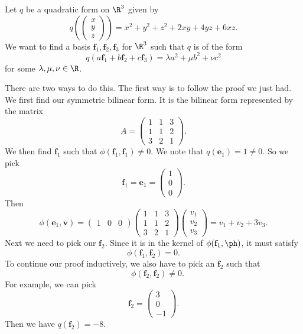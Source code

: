 \documentclass[a4paper]{article}
\begin{document}
\begin{eg}
  Let $q$ be a quadratic form on $\R^3$ given by
  \[
    q\left(
    \begin{pmatrix}
      x\\y\\z
    \end{pmatrix}\right) = x^2 + y^2 + z^2 + 2xy + 4yz + 6xz.
  \]
  We want to find a basis $\mathbf{f}_1, \mathbf{f}_2, \mathbf{f}_3$ for $\R^3$ such that $q$ is of the form
  \[
    q(a\mathbf{f}_1 + b\mathbf{f}_2 + c\mathbf{f}_3) = \lambda a^2 + \mu b^2 + \nu c^2
  \]
  for some $\lambda, \mu, \nu \in \R$.

  There are two ways to do this. The first way is to follow the proof we just had. We first find our symmetric bilinear form. It is the bilinear form represented by the matrix
  \[
    A =
    \begin{pmatrix}
      1 & 1 & 3\\
      1 & 1 & 2\\
      3 & 2 & 1
    \end{pmatrix}.
  \]
  We then find $\mathbf{f}_1$ such that $\phi(\mathbf{f}_1, \mathbf{f}_1) \not= 0$. We note that $q(\mathbf{e}_1) = 1\not= 0$. So we pick
  \[
    \mathbf{f}_1 = \mathbf{e}_1 =
    \begin{pmatrix}
      1\\0\\0
    \end{pmatrix}.
  \]
  Then
  \[
    \phi(\mathbf{e}_1, \mathbf{v}) =
    \begin{pmatrix}
      1 & 0 & 0
    \end{pmatrix}
    \begin{pmatrix}
      1 & 1 & 3\\
      1 & 1 & 2\\
      3 & 2 & 1
    \end{pmatrix}
    \begin{pmatrix}
      v_1\\v_2\\v_3
    \end{pmatrix} = v_1 + v_2 + 3v_3.
  \]
  Next we need to pick our $\mathbf{f}_2$. Since it is in the kernel of $\phi(\mathbf{f}_1, \ph)$, it must satisfy
  \[
    \phi(\mathbf{f}_1, \mathbf{f}_2) = 0.
  \]
  To continue our proof inductively, we also have to pick an $\mathbf{f}_2$ such that
  \[
    \quad \phi(\mathbf{f}_2, \mathbf{f}_2) \not= 0.
  \]
  For example, we can pick
  \[
    \mathbf{f}_2 =
    \begin{pmatrix}
      3\\0\\-1
    \end{pmatrix}.
  \]
  Then we have $q(\mathbf{f}_2) = -8$.


\end{eg}
\end{document}
